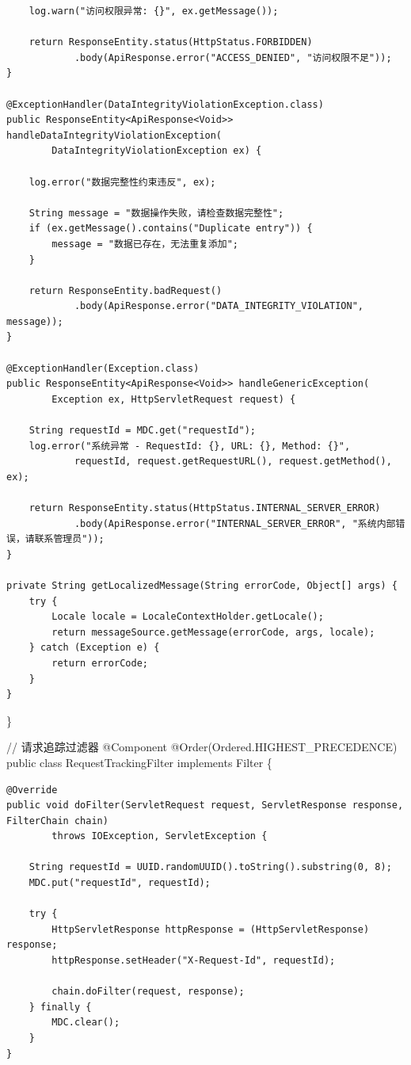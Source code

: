 \begin{verbatim}
    log.warn("访问权限异常: {}", ex.getMessage());
    
    return ResponseEntity.status(HttpStatus.FORBIDDEN)
            .body(ApiResponse.error("ACCESS_DENIED", "访问权限不足"));
}

@ExceptionHandler(DataIntegrityViolationException.class)
public ResponseEntity<ApiResponse<Void>> handleDataIntegrityViolationException(
        DataIntegrityViolationException ex) {
    
    log.error("数据完整性约束违反", ex);
    
    String message = "数据操作失败，请检查数据完整性";
    if (ex.getMessage().contains("Duplicate entry")) {
        message = "数据已存在，无法重复添加";
    }
    
    return ResponseEntity.badRequest()
            .body(ApiResponse.error("DATA_INTEGRITY_VIOLATION", message));
}

@ExceptionHandler(Exception.class)
public ResponseEntity<ApiResponse<Void>> handleGenericException(
        Exception ex, HttpServletRequest request) {
    
    String requestId = MDC.get("requestId");
    log.error("系统异常 - RequestId: {}, URL: {}, Method: {}", 
            requestId, request.getRequestURL(), request.getMethod(), ex);
    
    return ResponseEntity.status(HttpStatus.INTERNAL_SERVER_ERROR)
            .body(ApiResponse.error("INTERNAL_SERVER_ERROR", "系统内部错误，请联系管理员"));
}

private String getLocalizedMessage(String errorCode, Object[] args) {
    try {
        Locale locale = LocaleContextHolder.getLocale();
        return messageSource.getMessage(errorCode, args, locale);
    } catch (Exception e) {
        return errorCode;
    }
}
\end{verbatim}

\}

// 请求追踪过滤器 @Component @Order(Ordered.HIGHEST\_PRECEDENCE) public class RequestTrackingFilter implements Filter \{

\begin{verbatim}
@Override
public void doFilter(ServletRequest request, ServletResponse response, FilterChain chain) 
        throws IOException, ServletException {
    
    String requestId = UUID.randomUUID().toString().substring(0, 8);
    MDC.put("requestId", requestId);
    
    try {
        HttpServletResponse httpResponse = (HttpServletResponse) response;
        httpResponse.setHeader("X-Request-Id", requestId);
        
        chain.doFilter(request, response);
    } finally {
        MDC.clear();
    }
}
\end{verbatim}

